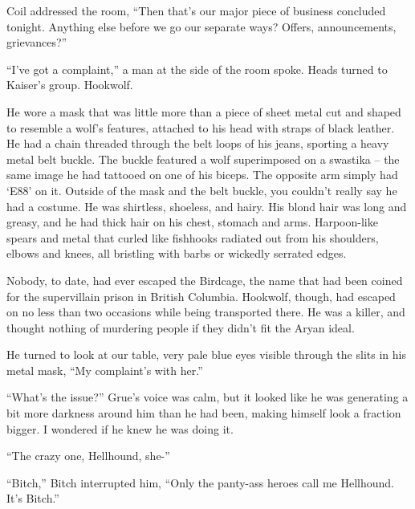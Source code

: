 





Coil addressed the room, ``Then that's our major piece of business concluded tonight.  Anything else before we go our separate ways?  Offers, announcements, grievances?''



``I've got a complaint,'' a man at the side of the room spoke.  Heads turned to Kaiser's group.  Hookwolf.



He wore a mask that was little more than a piece of sheet metal cut and shaped to resemble a wolf's features, attached to his head with straps of black leather.  He had a chain threaded through the belt loops of his jeans, sporting a heavy metal belt buckle.  The buckle featured a wolf superimposed on a swastika – the same image he had tattooed on one of his biceps.  The opposite arm simply had `E88' on it.  Outside of the mask and the belt buckle, you couldn't really say he had a costume.  He was shirtless, shoeless, and hairy.  His blond hair was long and greasy, and he had thick hair on his chest, stomach and arms.  Harpoon-like spears and metal that curled like fishhooks radiated out from his shoulders, elbows and knees, all bristling with barbs or wickedly serrated edges.



Nobody, to date, had ever escaped the Birdcage, the name that had been coined for the supervillain prison in British Columbia.  Hookwolf, though, had escaped on no less than two occasions while being transported there.  He was a killer, and thought nothing of murdering people if they didn't fit the Aryan ideal.



He turned to look at our table, very pale blue eyes visible through the slits in his metal mask, ``My complaint's with her.''



``What's the issue?'' Grue's voice was calm, but it looked like he was generating a bit more darkness around him than he had been, making himself look a fraction bigger.  I wondered if he knew he was doing it.



``The crazy one, Hellhound, she-''



``Bitch,'' Bitch interrupted him, ``Only the panty-ass heroes call me Hellhound.  It's Bitch.''



